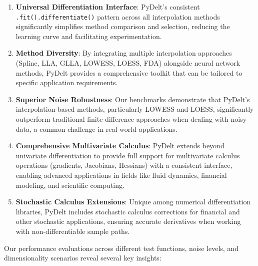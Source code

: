 \documentclass[11pt,a4paper]{article}
\begin{document}
\begin{enumerate}
    \item \textbf{Universal Differentiation Interface}: PyDelt's consistent \texttt{.fit().differentiate()} pattern across all interpolation methods significantly simplifies method comparison and selection, reducing the learning curve and facilitating experimentation.
    
    \item \textbf{Method Diversity}: By integrating multiple interpolation approaches (Spline, LLA, GLLA, LOWESS, LOESS, FDA) alongside neural network methods, PyDelt provides a comprehensive toolkit that can be tailored to specific application requirements.
    
    \item \textbf{Superior Noise Robustness}: Our benchmarks demonstrate that PyDelt's interpolation-based methods, particularly LOWESS and LOESS, significantly outperform traditional finite difference approaches when dealing with noisy data, a common challenge in real-world applications.
    
    \item \textbf{Comprehensive Multivariate Calculus}: PyDelt extends beyond univariate differentiation to provide full support for multivariate calculus operations (gradients, Jacobians, Hessians) with a consistent interface, enabling advanced applications in fields like fluid dynamics, financial modeling, and scientific computing.
    
    \item \textbf{Stochastic Calculus Extensions}: Unique among numerical differentiation libraries, PyDelt includes stochastic calculus corrections for financial and other stochastic applications, ensuring accurate derivatives when working with non-differentiable sample paths.
\end{enumerate}

Our performance evaluations across different test functions, noise levels, and dimensionality scenarios reveal several key insights:
\end{document}
